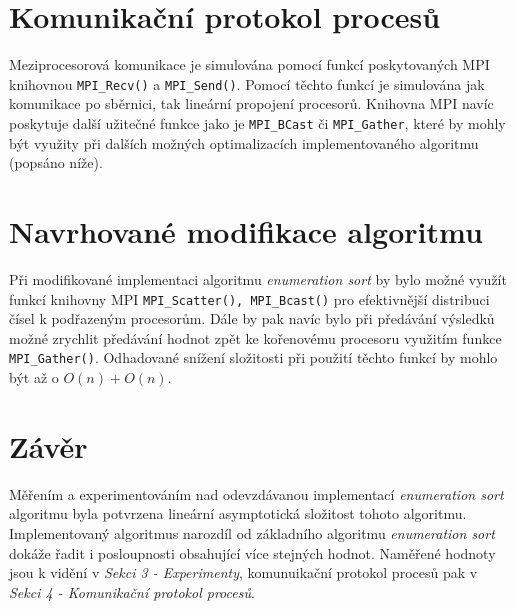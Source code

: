 \documentclass[a4paper,10pt]{article}
\newcommand{\Omicron}{O}
\begin{document}


	\section{Komunikační protokol procesů}
    	\par Meziprocesorová komunikace je simulována pomocí funkcí poskytovaných MPI knihovnou \texttt{MPI\_Recv()} a \texttt{MPI\_Send()}. Pomocí těchto funkcí je simulována jak komunikace po sběrnici, tak lineární propojení procesorů. Knihovna MPI navíc poskytuje další užitečné funkce jako je \texttt{MPI\_BCast} či \texttt{MPI\_Gather}, které by mohly být využity při dalších možných optimalizacích implementovaného algoritmu (popsáno níže).




    \section{Navrhované modifikace algoritmu}
    \par Při modifikované implementaci algoritmu \textit{enumeration sort} by bylo možné využít funkcí knihovny MPI \texttt{MPI\_Scatter(), MPI\_Bcast()} pro efektivnější distribuci čísel k podřazeným procesorům. Dále by pak navíc bylo při předávání výsledků možné zrychlit předávání hodnot zpět ke kořenovému procesoru využitím funkce \texttt{MPI\_Gather()}. Odhadované snížení složitosti při použití těchto funkcí by mohlo být až o $\Omicron\left(n\right) + \Omicron\left(n\right)$.

	\section{Závěr}
    	\par Měřením a experimentováním nad odevzdávanou implementací \textit{enumeration sort} algoritmu byla potvrzena lineární asymptotická složitost tohoto algoritmu. Implementovaný algoritmus narozdíl od základního algoritmu \textit{enumeration sort} dokáže řadit i posloupnosti obsahující více stejných hodnot. Naměřené hodnoty jsou k vidění v \textit{Sekci 3 \-- Experimenty}, komunuikační protokol procesů pak v \textit{Sekci 4 \-- Komunikační protokol procesů}. 
\end{document}
